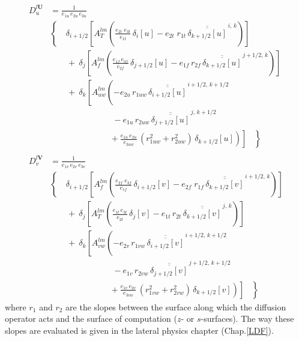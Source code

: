 \documentclass[NEMO_book]{subfiles}
\begin{document}
\begin{equation} \label{Eq_dyn_ldf_iso}
\begin{split}
 D_u^{l\textbf{U}} &= \frac{1}{e_{1u} \, e_{2u} \, e_{3u} }	\\
&  \left\{\quad  {\delta _{i+1/2} \left[ {A_T^{lm}  \left( 
	 {\frac{e_{2t} \; e_{3t} }{e_{1t} } \,\delta _{i}[u]
	-e_{2t} \; r_{1t} \,\overline{\overline {\delta _{k+1/2}[u]}}^{\,i,\,k}}
 \right)} \right]} 	\right.
\\ 
& \qquad +\ \delta_j \left[ {A_f^{lm} \left( {\frac{e_{1f}\,e_{3f} }{e_{2f} 
}\,\delta _{j+1/2} [u] - e_{1f}\, r_{2f} 
\,\overline{\overline {\delta _{k+1/2} [u]}} ^{\,j+1/2,\,k}} 
\right)} \right] 
\\ 
&\qquad +\ \delta_k \left[ {A_{uw}^{lm} \left( {-e_{2u} \, r_{1uw} \,\overline{\overline 
{\delta_{i+1/2} [u]}}^{\,i+1/2,\,k+1/2} } 
\right.} \right. 
\\ 
&  \ \qquad \qquad \qquad \quad\ 
- e_{1u} \, r_{2uw} \,\overline{\overline {\delta_{j+1/2} [u]}} ^{\,j,\,k+1/2}
\\ 
& \left. {\left. { \ \qquad \qquad \qquad \ \ \ \left. {\ 
+\frac{e_{1u}\, e_{2u} }{e_{3uw} }\,\left( {r_{1uw}^2+r_{2uw}^2} 
\right)\,\delta_{k+1/2} [u]} \right)} \right]\;\;\;} \right\} 
\\
\\
 D_v^{l\textbf{V}} &= \frac{1}{e_{1v} \, e_{2v} \, e_{3v} }    \\
&  \left\{\quad  {\delta _{i+1/2} \left[ {A_f^{lm}  \left( 
	 {\frac{e_{2f} \; e_{3f} }{e_{1f} } \,\delta _{i+1/2}[v]
	-e_{2f} \; r_{1f} \,\overline{\overline {\delta _{k+1/2}[v]}}^{\,i+1/2,\,k}}
 \right)} \right]} 	\right.
\\ 
& \qquad +\ \delta_j \left[ {A_T^{lm} \left( {\frac{e_{1t}\,e_{3t} }{e_{2t} 
}\,\delta _{j} [v] - e_{1t}\, r_{2t} 
\,\overline{\overline {\delta _{k+1/2} [v]}} ^{\,j,\,k}} 
\right)} \right] 
\\ 
& \qquad +\ \delta_k \left[ {A_{vw}^{lm} \left( {-e_{2v} \, r_{1vw} \,\overline{\overline 
{\delta_{i+1/2} [v]}}^{\,i+1/2,\,k+1/2} }\right.} \right. 
\\
&  \ \qquad \qquad \qquad \quad\ 
- e_{1v} \, r_{2vw} \,\overline{\overline {\delta_{j+1/2} [v]}} ^{\,j+1/2,\,k+1/2}
\\ 
& \left. {\left. { \ \qquad \qquad \qquad \ \ \ \left. {\ 
+\frac{e_{1v}\, e_{2v} }{e_{3vw} }\,\left( {r_{1vw}^2+r_{2vw}^2} 
\right)\,\delta_{k+1/2} [v]} \right)} \right]\;\;\;} \right\} 
 \end{split}
\end{equation}
where $r_1$ and $r_2$ are the slopes between the surface along which the 
diffusion operator acts and the surface of computation ($z$- or $s$-surfaces). 
The way these slopes are evaluated is given in the lateral physics chapter 
(Chap.\ref{LDF}).
\end{document}
